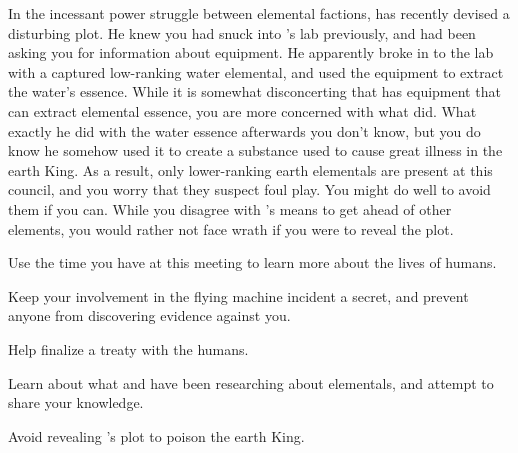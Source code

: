 \documentclass[char]{elementals}
\begin{document}
In the incessant power struggle between elemental factions, \cKing{} has recently devised a disturbing plot.  He knew you had snuck into \cGD{}'s lab previously, and had been asking you for information about  equipment. He apparently broke in to the lab with a captured low-ranking water elemental, and used the equipment to extract the water's essence.  While it is somewhat disconcerting that \cGD{} has equipment that can extract elemental essence, you are more concerned with what \cKing{} did.  What exactly he did with the water essence afterwards you don't know, but you do know he somehow used it to create a substance used to cause great illness in the earth King.  As a result, only lower-ranking earth elementals are present at this council, and you worry that they suspect foul play.  You might do well to avoid them if you can.  While you disagree with \cKing{}'s means to get ahead of other elements, you would rather not face \cKing{\their} wrath if you were to reveal the plot.  

\begin{itemz}[Goals]
  \item Use the time you have at this meeting to learn more about the lives of humans.
  \item Keep your involvement in the flying machine incident a secret, and prevent anyone from discovering evidence against you.
  \item Help \cKing{} finalize a treaty with the humans.
  \item Learn about what \cGD{} and \cScientist{} have been researching about elementals, and attempt to share your knowledge.  
  \item Avoid revealing \cKing{}'s plot to poison the earth King.
\end{itemz}
\end{document}

